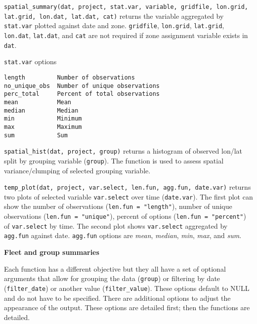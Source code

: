 \documentclass[
]{article}
\begin{document}
\texttt{spatial\_summary(dat,\ project,\ stat.var,\ variable,\ gridfile,\ lon.grid,\ lat.grid,\ lon.dat,\ lat.dat,\ cat)} returns the variable aggregated by \texttt{stat.var} plotted against date and zone. \texttt{gridfile}, \texttt{lon.grid}, \texttt{lat.grid}, \texttt{lon.dat}, \texttt{lat.dat}, and \texttt{cat} are not required if zone assignment variable exists in \texttt{dat}.

\texttt{stat.var} options

\begin{verbatim}
length         Number of observations
no_unique_obs  Number of unique observations
perc_total     Percent of total observations
mean           Mean  
median         Median  
min            Minimum  
max            Maximum  
sum            Sum
\end{verbatim}

\texttt{spatial\_hist(dat,\ project,\ group)} returns a histogram of observed lon/lat split by grouping variable (\texttt{group}). The function is used to assess spatial variance/clumping of selected grouping variable.

\texttt{temp\_plot(dat,\ project,\ var.select,\ len.fun,\ agg.fun,\ date.var)} returns two plots of selected variable \texttt{var.select} over time (\texttt{date.var}). The first plot can show the number of observations (\texttt{len.fun\ =\ "length"}), number of unique observations (\texttt{len.fun\ =\ "unique"}), percent of options (\texttt{len.fun\ =\ "percent"}) of \texttt{var.select} by time. The second plot shows \texttt{var.select} aggregated by \texttt{agg.fun} against date. \texttt{agg.fun} options are \emph{mean}, \emph{median}, \emph{min}, \emph{max}, and \emph{sum}.

\textbf{Fleet and group summaries}

Each function has a different objective but they all have a set of optional arguments that allow for grouping the data (\texttt{group}) or filtering by date (\texttt{filter\_date}) or another value (\texttt{filter\_value}). These options default to NULL and do not have to be specified. There are additional options to adjust the appearance of the output. These options are detailed first; then the functions are detailed.
\end{document}

